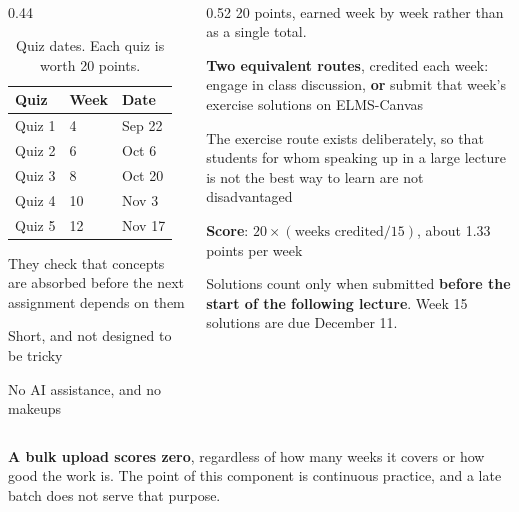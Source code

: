 \documentclass[
    10pt,
    dvipsnames,
    svgnames,
    x11names,
    aspectratio=1610,
    english,
    codeminted]{beamer}
\begin{document}
\begin{frame}[fragile]{\secname}
\framesubtitle{\subsecname}
\begin{columns}[T,onlytextwidth]
\begin{column}{0.44\textwidth}
\begin{table}[h]
\caption{Quiz dates. Each quiz is worth 20 points.}
\scriptsize\centering
\renewcommand{\arraystretch}{1.2}
\begin{tabular}{m{1.2cm}m{1.1cm}m{1.6cm}}
  \toprule
  \textbf{Quiz} & \textbf{Week} & \textbf{Date} \\
  \midrule
  Quiz 1 & 4  & Sep 22 \\
  Quiz 2 & 6  & Oct 6 \\
  Quiz 3 & 8  & Oct 20 \\
  Quiz 4 & 10 & Nov 3 \\
  Quiz 5 & 12 & Nov 17 \\
  \bottomrule
\end{tabular}
\end{table}
\begin{compactitem}
\small
    \item They check that concepts are absorbed before the next assignment depends on them
    \item Short, and not designed to be tricky
    \item No AI assistance, and no makeups
\end{compactitem}
\end{column}
\begin{column}{0.52\textwidth}
20 points, earned week by week rather than as a single total.

\begin{compactitem}
\small
    \item \textbf{Two equivalent routes}, credited each week: engage in class discussion, \textbf{or} submit that week's exercise solutions on ELMS-Canvas
    \item The exercise route exists deliberately, so that students for whom speaking up in a large lecture is not the best way to learn are not disadvantaged
    \item \textbf{Score}: $20 \times (\text{weeks credited} / 15)$, about 1.33 points per week
    \item Solutions count only when submitted \textbf{before the start of the following lecture}. Week 15 solutions are due December 11.
\end{compactitem}
\end{column}
\end{columns}

\medskip
\begin{MyBox}
\footnotesize
\textbf{A bulk upload scores zero}, regardless of how many weeks it covers or how good the work is. The point of this component is continuous practice, and a late batch does not serve that purpose.
\end{MyBox}
\end{frame}
\end{document}
